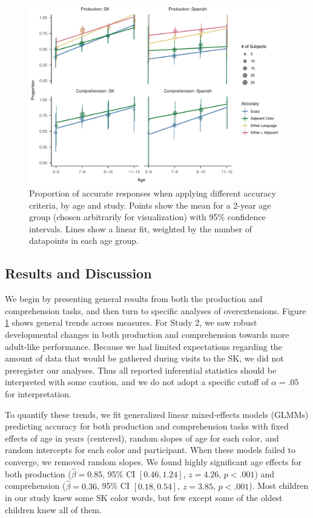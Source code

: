 \documentclass[
  ,apa7,floatsintext]{apa6}
\begin{document}
\begin{figure}
\centering
\includegraphics{amazon_color_files/figure-latex/study23-accuracy-1.pdf}
\caption{\label{fig:study23-accuracy}Proportion of accurate responses when applying different accuracy criteria, by age and study. Points show the mean for a 2-year age group (chosen arbitrarily for visualization) with 95\% confidence intervals. Lines show a linear fit, weighted by the number of datapoints in each age group.}
\end{figure}

\hypertarget{results-and-discussion-1}{%
\subsection{Results and Discussion}\label{results-and-discussion-1}}

We begin by presenting general results from both the production and comprehension tasks, and then turn to specific analyses of overextensions. Figure \ref{fig:study23-accuracy} shows general trends across measures. For Study 2, we saw robust developmental changes in both production and comprehension towards more adult-like performance. Because we had limited expectations regarding the amount of data that would be gathered during visits to the SK, we did not preregister our analyses. Thus all reported inferential statistics should be interpreted with some caution, and we do not adopt a specific cutoff of \(\alpha = .05\) for interpretation.

To quantify these trends, we fit generalized linear mixed-effects models (GLMMs) predicting accuracy for both production and comprehension tasks with fixed effects of age in years (centered), random slopes of age for each color, and random intercepts for each color and participant. When these models failed to converge, we removed random slopes. We found highly significant age effects for both production (\(\hat{\beta} = 0.85\), 95\% CI \([0.46, 1.24]\), \(z = 4.26\), \(p < .001\)) and comprehension (\(\hat{\beta} = 0.36\), 95\% CI \([0.18, 0.54]\), \(z = 3.85\), \(p < .001\)). Most children in our study knew some SK color words, but few except some of the oldest children knew all of them.
\end{document}
